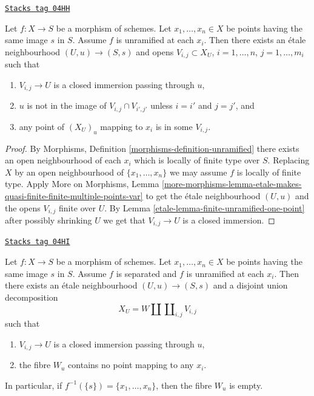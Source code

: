 \begin{lemma}
\label{etale-lemma-unramified-etale-local}
\href{https://stacks.math.columbia.edu/tag/04HH}{\texttt{Stacks tag 04HH}}

Let $f : X \to S$ be a morphism of schemes.
Let $x_1, \ldots, x_n \in X$ be points having the same image $s$ in $S$.
Assume $f$ is unramified at each $x_i$.
Then there exists an \'etale neighbourhood $(U, u) \to (S, s)$
and opens $V_{i, j} \subset X_U$, $i = 1, \ldots, n$, $j = 1, \ldots, m_i$
such that
\begin{enumerate}
\item $V_{i, j} \to U$ is a closed immersion passing through $u$,
\item $u$ is not in the image of $V_{i, j} \cap V_{i', j'}$ unless
$i = i'$ and $j = j'$, and
\item any point of $(X_U)_u$ mapping to $x_i$ is in some $V_{i, j}$.
\end{enumerate}
\end{lemma}

\begin{proof}

By
Morphisms, Definition \ref{morphisms-definition-unramified}
there exists an open neighbourhood of each $x_i$ which is locally of finite
type over $S$. Replacing $X$ by an open neighbourhood of $\{x_1, \ldots, x_n\}$
we may assume $f$ is locally of finite type. Apply
More on Morphisms, Lemma
\ref{more-morphisms-lemma-etale-makes-quasi-finite-finite-multiple-points-var}
to get the \'etale neighbourhood $(U, u)$ and the opens $V_{i, j}$ finite over
$U$. By
Lemma \ref{etale-lemma-finite-unramified-one-point}
after possibly shrinking $U$ we get that $V_{i, j} \to U$ is a closed
immersion.
\end{proof}

\begin{lemma}
\label{etale-lemma-unramified-etale-local-technical}
\href{https://stacks.math.columbia.edu/tag/04HI}{\texttt{Stacks tag 04HI}}

Let $f : X \to S$ be a morphism of schemes.
Let $x_1, \ldots, x_n \in X$ be points having the same image $s$ in $S$.
Assume $f$ is separated and $f$ is unramified at each $x_i$.
Then there exists an \'etale neighbourhood $(U, u) \to (S, s)$
and a disjoint union decomposition
$$
X_U =
W \amalg \coprod\nolimits_{i, j} V_{i, j}
$$
such that
\begin{enumerate}
\item $V_{i, j} \to U$ is a closed immersion passing through $u$,
\item the fibre $W_u$ contains no point mapping to any $x_i$.
\end{enumerate}
In particular, if $f^{-1}(\{s\}) = \{x_1, \ldots, x_n\}$, then
the fibre $W_u$ is empty.
\end{lemma}

